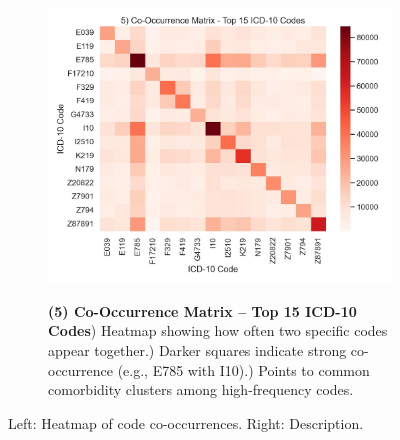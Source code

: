 \begin{figure}[ht!]
    \centering
    \begin{subfigure}{0.42\textwidth}
        \includegraphics[width=\linewidth]{mimic_plots/plot5.jpg}
    \end{subfigure}\hfill
    \begin{subfigure}{0.54\textwidth}
        \footnotesize
        \textbf{(5) Co-Occurrence Matrix -- Top 15 ICD-10 Codes}) Heatmap showing how often two specific codes appear together.) Darker squares indicate strong co-occurrence (e.g., E785 with I10).) Points to common comorbidity clusters among high-frequency codes.
    \end{subfigure}
    \caption{Left: Heatmap of code co-occurrences. Right: Description.}
    \label{fig:plot5}
\end{figure}

